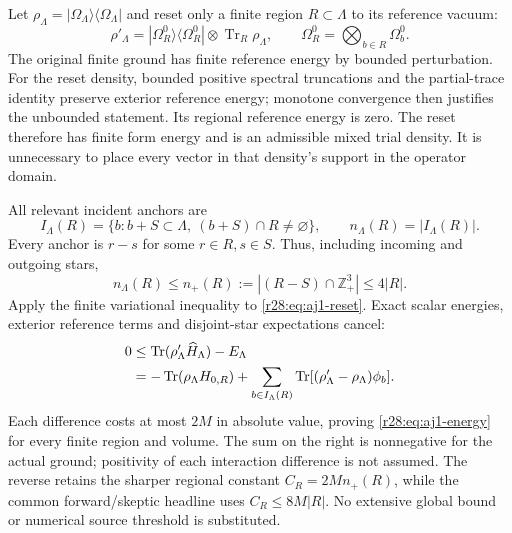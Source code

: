 Let $\rho_\Lambda=|\Omega_\Lambda\rangle\langle\Omega_\Lambda|$ and reset only a finite region $R\subset\Lambda$ to its reference vacuum:
\begin{equation}
 \rho'_\Lambda=|\Omega_R^0\rangle\langle\Omega_R^0|
               \otimes\operatorname{Tr}_R\rho_\Lambda,
 \qquad\Omega_R^0=\bigotimes_{b\in R}\Omega_b^0.
 \label{r28:eq:aj1-reset}
\end{equation}
The original finite ground has finite reference energy by bounded perturbation. For the reset density, bounded positive spectral truncations and the partial-trace identity preserve exterior reference energy; monotone convergence then justifies the unbounded statement. Its regional reference energy is zero. The reset therefore has finite form energy and is an admissible mixed trial density. It is unnecessary to place every vector in that density's support in the operator domain.

All relevant incident anchors are
\begin{equation}
 I_\Lambda(R)=\{b:b+S\subset\Lambda,\ (b+S)\cap R\ne\varnothing\},
 \qquad n_\Lambda(R)=|I_\Lambda(R)|.
\end{equation}
Every anchor is $r-s$ for some $r\in R,s\in S$. Thus, including incoming and outgoing stars,
\begin{equation}
 n_\Lambda(R)\le n_+(R):=|(R-S)\cap\mathbb Z_+^3|\le4|R|.
 \label{r28:eq:aj1-incidence}
\end{equation}
Apply the finite variational inequality to \eqref{r28:eq:aj1-reset}. Exact scalar energies, exterior reference terms and disjoint-star expectations cancel:
\begin{align}
 0&\le\operatorname{Tr}(\rho'_\Lambda\widehat H_\Lambda)-E_\Lambda\notag\\
 &=-\operatorname{Tr}(\rho_\Lambda H_{0,R})
   +\sum_{b\in I_\Lambda(R)}
       \operatorname{Tr}[(\rho'_\Lambda-\rho_\Lambda)\phi_b].
 \label{r28:eq:aj1-variational}
\end{align}
Each difference costs at most $2M$ in absolute value, proving \eqref{r28:eq:aj1-energy} for every finite region and volume. The sum on the right is nonnegative for the actual ground; positivity of each interaction difference is not assumed. The reverse retains the sharper regional constant $C_R=2Mn_+(R)$, while the common forward/skeptic headline uses $C_R\le8M|R|$. No extensive global bound or numerical source threshold is substituted.

